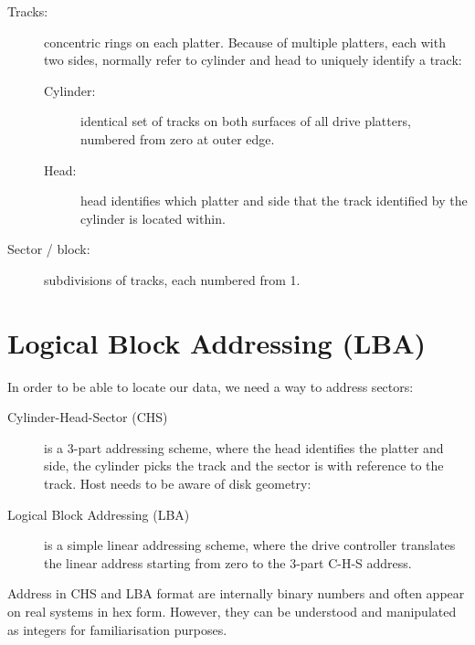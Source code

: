 \documentclass[slides]{pgnotes}
\begin{document}
\begin{minipage}{0.4\linewidth}
\end{minipage}
\begin{minipage}{0.59\linewidth}
\begin{description}

\item[Tracks:]
concentric rings on each platter. Because of multiple platters, each
with two sides, normally refer to cylinder and head to uniquely identify
a track:

\begin{description}
\item[Cylinder:]
identical set of tracks on both surfaces of all drive platters, numbered
from zero at outer edge.
\item[Head:]
head identifies which platter and side that the track identified by the
cylinder is located within.
\end{description}

\item[Sector / block:]
subdivisions of tracks, each numbered from 1.
\end{description}
\end{minipage}

\section{Logical Block Addressing (LBA)}
\label{sec:logical-block-addressing}

In order to be able to locate our data, we need a way to address
sectors:

\begin{description}
\item[Cylinder-Head-Sector (CHS)]
is a 3-part addressing scheme, where the head identifies the platter and
side, the cylinder picks the track and the sector is with reference to
the track. Host needs to be aware of disk geometry:
\item[Logical Block Addressing (LBA)]
is a simple linear addressing scheme, where the drive controller
translates the linear address starting from zero to the 3-part C-H-S
address.
\end{description}

Address in CHS and LBA format are internally binary numbers and often
appear on real systems in hex form. However, they can be understood and
manipulated as integers for familiarisation purposes.
\end{document}
